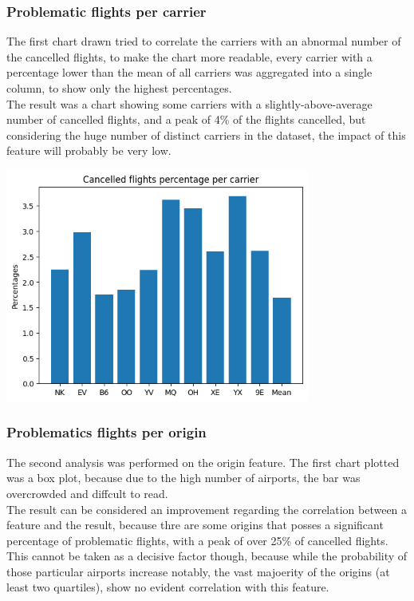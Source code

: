 \documentclass[
	letterpaper, %
	10pt, %
]{class}
\begin{document}
\subsubsection{Problematic flights per carrier}
The first chart drawn tried to correlate the carriers with an abnormal number of the cancelled flights, to make the chart more readable, every carrier with a percentage lower than the mean of all carriers was aggregated into a single column, to show only the highest percentages.\\

The result was a chart showing some carriers with a slightly-above-average number of cancelled flights, and a peak of 4\% of the flights  cancelled, but considering the huge number of distinct carriers in the dataset, the impact of this feature will probably be very low.

\begin{center}
    \includegraphics[width=10cm]{../images/cancelled_per_carrier.png}
\end{center}

\subsubsection{Problematics flights per origin}
The second analysis was performed on the origin feature.
The first chart plotted was a box plot, because due to the high number of airports, the bar was overcrowded and diffcult to read.\\

The result can be considered an improvement regarding the correlation between a feature and the result, because thre are some origins that posses a significant percentage
of problematic flights, with a peak of over 25\% of cancelled flights. This cannot be taken as a decisive factor though, because while the probability of those particular airports increase notably, the vast majoerity of the origins (at least two quartiles), show no evident correlation with this feature.
\end{document}
